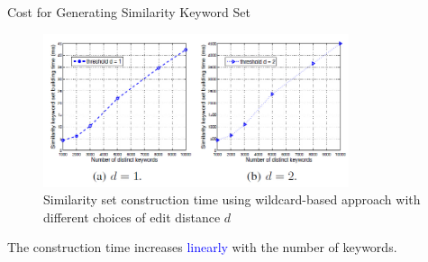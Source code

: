 \documentclass{beamer}
\begin{document}
\begin{frame}{Cost for Generating Similarity Keyword Set}
	\begin{figure}
        \includegraphics[width=0.8\textwidth]{subfig1.jpg}
        \caption{Similarity set construction time using wildcard-based approach with different choices of edit distance $d$}
	\end{figure}
	\begin{block}{}
		The construction time increases \textcolor{blue}{linearly} with the number of keywords.
	\end{block}
\end{frame}
\end{document}
